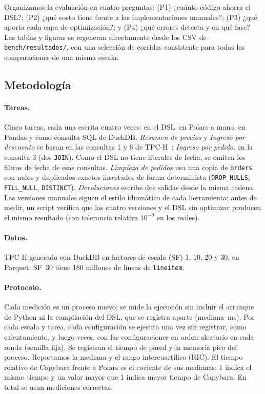 \documentclass[sigplan,screen,nonacm]{acmart}
\begin{document}
Organizamos la evaluación en cuatro preguntas: (P1) ¿cuánto código ahorra el DSL?;
(P2) ¿qué costo tiene frente a las implementaciones manuales?; (P3) ¿qué aporta cada capa
de optimización?; y (P4) ¿qué errores detecta y en qué fase? Las tablas y figuras se
regeneran directamente desde los CSV de \texttt{bench/resultados/}, con una selección
de corridas consistente para todas las comparaciones de una misma escala.

\subsection{Metodología}

\paragraph{Tareas.} Cinco tareas, cada una escrita cuatro veces: en el DSL, en Polars a
mano, en Pandas y como consulta SQL de DuckDB. \emph{Resumen de precios} y \emph{Ingreso por
descuento} se basan en las consultas 1 y 6 de TPC-H~\cite{tpch}; \emph{Ingreso por pedido},
en la consulta 3 (dos \texttt{JOIN}). Como el DSL no tiene literales de fecha, se omiten los
filtros de fecha de esas consultas. \emph{Limpieza de pedidos} usa una copia de
\texttt{orders} con nulos y duplicados exactos insertados de forma determinista
(\texttt{DROP\_NULLS}, \texttt{FILL\_NULL}, \texttt{DISTINCT}). \emph{Devoluciones} escribe dos
salidas desde la misma cadena. Las versiones manuales siguen el estilo idiomático de cada
herramienta; antes de medir, un script verifica que las cuatro versiones y el DSL sin
optimizar producen el mismo resultado (con tolerancia relativa $10^{-9}$ en los reales).

\paragraph{Datos.} TPC-H generado con DuckDB en factores de escala (SF) 1, 10, 20 y 30, en
Parquet. SF~30 tiene 180 millones de líneas de \texttt{lineitem}.

\paragraph{Protocolo.} Cada medición es un proceso nuevo; se mide la ejecución sin incluir el
arranque de Python ni la compilación del DSL, que se registra aparte (mediana
\compilacionMs{}\,ms). Por cada escala y tarea, cada configuración se ejecuta una vez sin
registrar, como calentamiento, y luego \repeticiones{} veces, con las configuraciones en orden
aleatorio en cada ronda (semilla fija). Se registran el tiempo de pared y la memoria pico del
proceso. Reportamos la mediana y el rango intercuartílico (RIC). El tiempo relativo de
Capybara frente a Polars es el cociente de sus medianas: 1 indica el mismo tiempo y
un valor mayor que 1 indica mayor tiempo de Capybara. En total se usan \mediciones{}
mediciones correctas.
\end{document}
